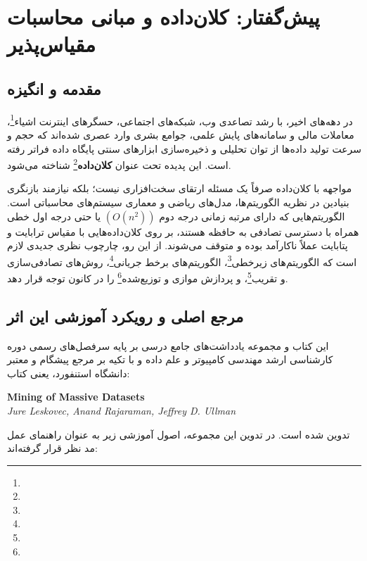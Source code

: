 \chapter*{پیش‌گفتار: کلان‌داده و مبانی محاسبات مقیاس‌پذیر}

\section*{مقدمه و انگیزه}
در دهه‌های اخیر، با رشد تصاعدی وب، شبکه‌های اجتماعی، حسگرهای اینترنت اشیاء\footnote{}، معاملات مالی و سامانه‌های پایش علمی، جوامع بشری وارد عصری شده‌اند که حجم و سرعت تولید داده‌ها از توان تحلیلی و ذخیره‌سازی ابزارهای سنتی پایگاه داده فراتر رفته است. این پدیده تحت عنوان \textbf{کلان‌داده}\footnote{} شناخته می‌شود. 

مواجهه با کلان‌داده صرفاً یک مسئله ارتقای سخت‌افزاری نیست؛ بلکه نیازمند بازنگری بنیادین در نظریه الگوریتم‌ها، مدل‌های ریاضی و معماری سیستم‌های محاسباتی است. الگوریتم‌هایی که دارای مرتبه زمانی درجه دوم $(O(n^2))$ یا حتی درجه اول خطی همراه با دسترسی تصادفی به حافظه هستند، بر روی کلان‌داده‌هایی با مقیاس ترابایت و پتابایت عملاً ناکارآمد بوده و متوقف می‌شوند. از این رو، چارچوب نظری جدیدی لازم است که الگوریتم‌های زیرخطی\footnote{}، الگوریتم‌های برخط جریانی\footnote{}، روش‌های تصادفی‌سازی و تقریب\footnote{}، و پردازش موازی و توزیع‌شده\footnote{} را در کانون توجه قرار دهد.

\section*{مرجع اصلی و رویکرد آموزشی این اثر}
این کتاب و مجموعه یادداشت‌های جامع درسی بر پایه سرفصل‌های رسمی دوره کارشناسی ارشد مهندسی کامپیوتر و علم داده و با تکیه بر مرجع پیشگام و معتبر دانشگاه استنفورد، یعنی کتاب:
\begin{center}
\textbf{Mining of Massive Datasets }~\cite{leskovec2020mining} \\
\textit{Jure Leskovec, Anand Rajaraman, Jeffrey D. Ullman}
\end{center}
تدوین شده است. در تدوین این مجموعه، اصول آموزشی زیر به عنوان راهنمای عمل مد نظر قرار گرفته‌اند:

